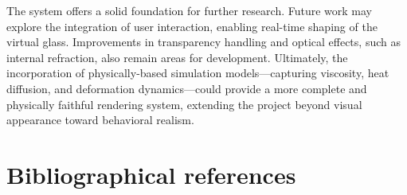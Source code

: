 \documentclass{rapportcs}
\begin{document}
    The system offers a solid foundation for further research. Future work may explore the integration of user interaction, enabling real-time shaping of the virtual glass. Improvements in transparency handling and optical effects, such as internal refraction, also remain areas for development. Ultimately, the incorporation of physically-based simulation models—capturing viscosity, heat diffusion, and deformation dynamics—could provide a more complete and physically faithful rendering system, extending the project beyond visual appearance toward behavioral realism.

\newpage
    
\section{Bibliographical references}
    \nocite{*}
    \begingroup
        \renewcommand{\refname}{}%
        \vspace*{-2em} %
    \endgroup
\end{document}
